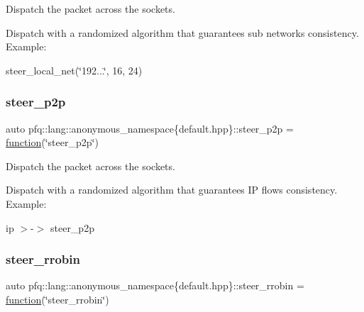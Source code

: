 Dispatch the packet across the sockets. 

Dispatch with a randomized algorithm that guarantees sub networks consistency. Example\+:

steer\+\_\+local\+\_\+net(\char`\"{}192...\char`\"{}, 16, 24) \mbox{\label{namespacepfq_1_1lang_1_1anonymous__namespace_02default_8hpp_03_a93e5f91a2b955269de017225cf62e711}} 
\subsubsection{\texorpdfstring{steer\+\_\+p2p}{steer\_p2p}}
{\footnotesize\ttfamily auto pfq\+::lang\+::anonymous\+\_\+namespace\{default.\+hpp\}\+::steer\+\_\+p2p = \hyperlink{namespacepfq_1_1lang_a1a4638059d700ae08d0ca63886ff2bb3}{function}(\char`\"{}steer\+\_\+p2p\char`\"{})}



Dispatch the packet across the sockets. 

Dispatch with a randomized algorithm that guarantees IP flows consistency. Example\+:

ip $>$-\/$>$ steer\+\_\+p2p \mbox{\label{namespacepfq_1_1lang_1_1anonymous__namespace_02default_8hpp_03_a98f503710ebfe66f6866d642af30b1a8}} 
\subsubsection{\texorpdfstring{steer\+\_\+rrobin}{steer\_rrobin}}
{\footnotesize\ttfamily auto pfq\+::lang\+::anonymous\+\_\+namespace\{default.\+hpp\}\+::steer\+\_\+rrobin = \hyperlink{namespacepfq_1_1lang_a1a4638059d700ae08d0ca63886ff2bb3}{function}(\char`\"{}steer\+\_\+rrobin\char`\"{})}



